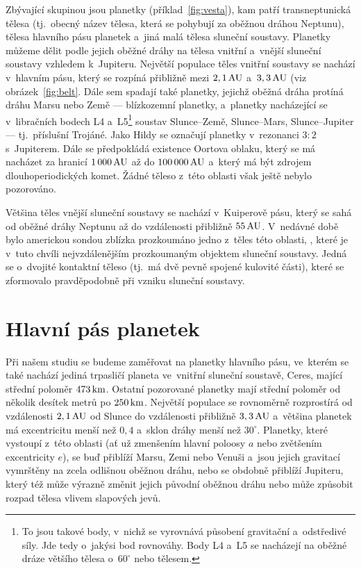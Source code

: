 \documentclass[A4paper, 12pt, oneside, openany]{book}
\begin{document}
Zbývající skupinou jsou planetky (příklad~\ref{fig:vesta}), kam patří transneptunická tělesa (tj.\ obecný název tělesa, která se pohybují za oběžnou dráhou Neptunu), tělesa hlavního pásu planetek a~jiná malá tělesa sluneční soustavy. Planetky můžeme dělit podle jejich oběžné dráhy na tělesa vnitřní a~vnější sluneční soustavy vzhledem k~Jupiteru. Největší populace těles vnitřní soustavy se nachází v~hlavním pásu, který se rozpíná přibližně mezi $2,1\, {\rm AU}$ a~$3,3\, {\rm AU}$ (viz obrázek~\ref{fig:belt}. Dále sem spadají také planetky, jejichž oběžná dráha protíná dráhu Marsu nebo Země --- blízkozemní planetky, a~planetky nacházející se v~libračních bodech L4 a~L5\footnote{To jsou takové body, v~nichž se vyrovnává působení gravitační a~odstředivé síly. Jde tedy o~jakýsi bod rovnováhy. Body L4 a~L5 se nacházejí na oběžné dráze většího tělesa o~$60^\circ$  nebo  tělesem.} soustav Slunce--Země, Slunce--Mars, Slunce--Jupiter --- tj.\ příslušní Trojáné. Jako Hildy se označují planetky v~rezonanci $3:2$ s~Jupiterem. Dále se předpokládá existence Oortova oblaku, který se má nacházet za hranicí $1\,000\,{\rm AU}$ až do $100\,000\,{\rm AU}$ a~který má být zdrojem dlouhoperiodických komet. Žádné těleso z~této oblasti však ještě nebylo pozorováno.

Většina těles vnější sluneční soustavy se nachází v~Kuiperově pásu, který se sahá od oběžné dráhy Neptunu až do vzdálenosti přibližně $55\, {\rm AU}$. V~nedávné době bylo americkou sondou  zblízka prozkoumáno jedno z~těles této oblasti, , které je v~tuto chvíli nejvzdálenějším prozkoumaným objektem sluneční soustavy. Jedná se o~dvojité kontaktní těleso (tj.\ má dvě pevně spojené kulovité části), které se zformovalo pravděpodobně při vzniku sluneční soustavy.~\cite{ultimathule}

\pagebreak
\section{Hlavní pás planetek}
Při našem studiu se budeme zaměřovat na planetky hlavního pásu, ve~kterém se také nachází jediná trpasličí planeta ve~vnitřní sluneční soustavě, Ceres, mající střední poloměr $473\, {\rm km}$. Ostatní pozorované planetky mají střední poloměr od několik desítek metrů po $250\, {\rm km}$. Největší populace se rovnoměrně rozprostírá od vzdálenosti $2,1\, {\rm AU}$ od Slunce do vzdálenosti přibližně $3,3\, {\rm AU}$ a~většina planetek má excentricitu menší než $0,4$ a~sklon dráhy menší než $30^\circ$. Planetky, které vystoupí z~této oblasti (ať už zmenšením hlavní poloosy $a$ nebo zvětšením excentricity $e$), se buď přiblíží Marsu, Zemi nebo Venuši a~jsou jejich gravitací vymrštěny na zcela odlišnou oběžnou dráhu, nebo se obdobně přiblíží Jupiteru, který též může výrazně změnit jejich původní oběžnou dráhu nebo může způsobit rozpad tělesa vlivem slapových jevů.
\end{document}
